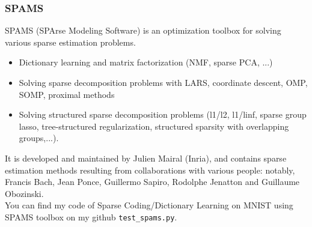 \documentclass[a4paper,10pt]{article}
\begin{document}
\subsubsection{SPAMS}
SPAMS (SPArse Modeling Software) is an optimization toolbox for solving various sparse estimation problems.
\begin{itemize}
 \item Dictionary learning and matrix factorization (NMF, sparse PCA, ...)
 \item Solving sparse decomposition problems with LARS, coordinate descent, OMP, SOMP, proximal methods
 \item Solving structured sparse decomposition problems (l1/l2, l1/linf, sparse group lasso, tree-structured regularization, structured sparsity with overlapping groups,...).
\end{itemize}
It is developed and maintained by Julien Mairal (Inria), and contains sparse estimation methods resulting from collaborations with various people: notably, Francis Bach, Jean Ponce, Guillermo Sapiro, Rodolphe Jenatton and Guillaume Obozinski.\\
You can find my code of Sparse Coding/Dictionary Learning on MNIST using SPAMS toolbox on my github \texttt{test\_spams.py}.\\
\newpage
\end{document}
